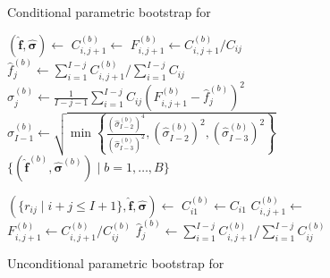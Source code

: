 \documentclass[a4paper]{book}
\begin{document}
\begin{figure}[p]
  \begin{algorithm}[H]
    \caption{Conditional parametric bootstrap for }
    \label{alg:cond-param-mack}
    \begin{algorithmic}
      \State $(\bm{\widehat{f}}, \bm{\widehat{\sigma}}) \gets$ 
            \State $C^{(b)}_{i, j + 1} \gets$ 
            \State $\displaystyle F^{(b)}_{i, j + 1} \gets C^{(b)}_{i, j + 1} / C_{ij}$
          \EndFor
          \State $\widehat{f}^{(b)}_j \gets \sum_{i = 1}^{I - j} C^{(b)}_{i, j + 1} / \sum_{i = 1}^{I - j} C_{ij}$
            \State $\displaystyle \widehat{\sigma}^{(b)}_j \gets \frac{1}{I - j - 1}\sum_{i = 1}^{I - j} C_{ij} \left( F^{(b)}_{i, j + 1} - \widehat{f}^{(b)}_j \right)^2$
          \Else
            \State $\widehat{\sigma}^{(b)}_{I - 1} \gets \sqrt{\min{ \left \{ \displaystyle \frac{(\widehat{\sigma}^{(b)}_{I - 2})^4}{(\widehat{\sigma}^{(b)}_{I - 3})^2}, (\widehat{\sigma}^{(b)}_{I - 2})^2, (\widehat{\sigma}^{(b)}_{I - 3})^2 \right \} }}$
          \EndIf
        \EndFor
      \EndFor
      \State \Return $\{ (\widehat{\bm{f}}^{(b)}, \widehat{\bm{\sigma}}^{(b)}) \mid b = 1, \dots, B \}$
    \end{algorithmic}
  \end{algorithm}
  \begin{algorithm}[H]
    \caption{Unconditional parametric bootstrap for }
    \label{alg:uncond-param-mack}
    \begin{algorithmic}
      \State $(\{ r_{ij} \mid i + j \leq I + 1 \}, \bm{\widehat{f}}, \bm{\widehat{\sigma}}) \gets$ 
          \State $C^{(b)}_{i1} \gets C_{i1}$
        \EndFor
            \State $C^{(b)}_{i, j + 1} \gets$ 
            \State $\displaystyle F^{(b)}_{i, j + 1} \gets C^{(b)}_{i, j + 1} / C^{(b)}_{ij}$
          \EndFor
          \State $\widehat{f}^{(b)}_j \gets \sum_{i = 1}^{I - j} C^{(b)}_{i, j + 1} / \sum_{i = 1}^{I - j} C^{(b)}_{ij}$

\end{algorithmic}
\end{algorithm}
\end{figure}
\end{document}
